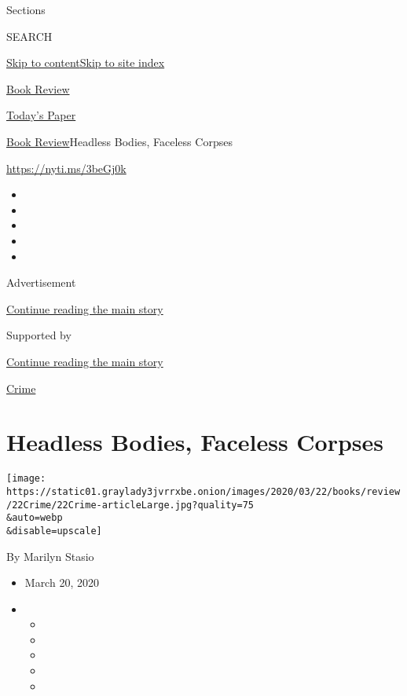 Sections

SEARCH

\protect\hyperlink{site-content}{Skip to
content}\protect\hyperlink{site-index}{Skip to site index}

\href{https://www.nytimes3xbfgragh.onion/section/books/review}{Book
Review}

\href{https://myaccount.nytimes3xbfgragh.onion/auth/login?response_type=cookie\&client_id=vi}{}

\href{https://www.nytimes3xbfgragh.onion/section/todayspaper}{Today's
Paper}

\href{/section/books/review}{Book Review}\textbar{}Headless Bodies,
Faceless Corpses

\url{https://nyti.ms/3beGj0k}

\begin{itemize}
\item
\item
\item
\item
\item
\end{itemize}

Advertisement

\protect\hyperlink{after-top}{Continue reading the main story}

Supported by

\protect\hyperlink{after-sponsor}{Continue reading the main story}

\href{/column/crime}{Crime}

\hypertarget{headless-bodies-faceless-corpses}{%
\section{Headless Bodies, Faceless
Corpses}\label{headless-bodies-faceless-corpses}}

\texttt{[image: https://static01.graylady3jvrrxbe.onion/images/2020/03/22/books/review/22Crime/22Crime-articleLarge.jpg?quality=75\\\&auto=webp\\\&disable=upscale]}

By Marilyn Stasio

\begin{itemize}
\item
  March 20, 2020
\item
  \begin{itemize}
  \item
  \item
  \item
  \item
  \item
  \end{itemize}
\end{itemize}

